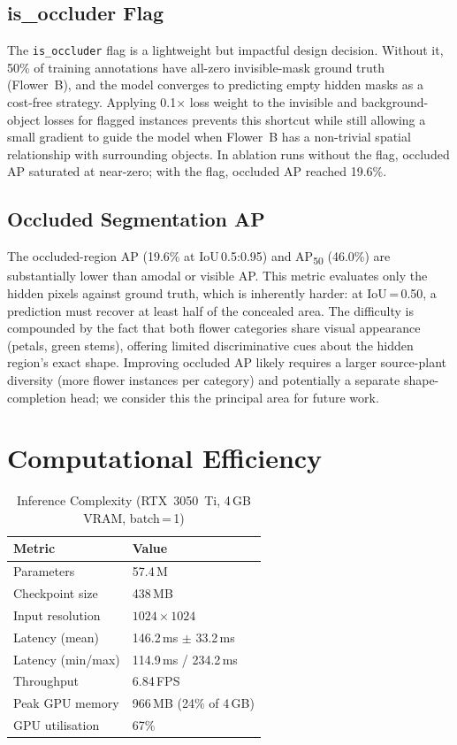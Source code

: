 \documentclass[conference]{IEEEtran}
\begin{document}
\subsection{is\_occluder Flag}

The \texttt{is\_occluder} flag is a lightweight but impactful design
decision.
Without it, 50\% of training annotations have all-zero invisible-mask
ground truth (Flower~B), and the model converges to predicting empty
hidden masks as a cost-free strategy.
Applying 0.1$\times$ loss weight to the invisible and background-object
losses for flagged instances prevents this shortcut while still allowing
a small gradient to guide the model when Flower~B has a non-trivial
spatial relationship with surrounding objects.
In ablation runs without the flag, occluded AP saturated at near-zero;
with the flag, occluded AP reached 19.6\%.

\subsection{Occluded Segmentation AP}

The occluded-region AP (19.6\% at IoU\,0.5:0.95) and AP\textsubscript{50}
(46.0\%) are substantially lower than amodal or visible AP.
This metric evaluates only the hidden pixels against ground truth, which
is inherently harder: at IoU\,=\,0.50, a prediction must recover at least
half of the concealed area.
The difficulty is compounded by the fact that both flower categories share
visual appearance (petals, green stems), offering limited discriminative
cues about the hidden region's exact shape.
Improving occluded AP likely requires a larger source-plant diversity
(more flower instances per category) and potentially a separate shape-completion
head; we consider this the principal area for future work.

\section{Computational Efficiency}

\begin{table}[h]
  \centering
  \caption{Inference Complexity (RTX~3050~Ti, 4\,GB VRAM, batch\,=\,1)}
  \label{tab:compute}
  \begin{tabular}{ll}
    \toprule
    Metric               & Value \\
    \midrule
    Parameters           & 57.4\,M \\
    Checkpoint size      & 438\,MB \\
    Input resolution     & $1024{\times}1024$ \\
    Latency (mean)       & 146.2\,ms $\pm$ 33.2\,ms \\
    Latency (min/max)    & 114.9\,ms / 234.2\,ms \\
    Throughput           & 6.84\,FPS \\
    Peak GPU memory      & 966\,MB (24\% of 4\,GB) \\
    GPU utilisation      & 67\% \\
    \bottomrule
  \end{tabular}
\end{table}
\end{document}
